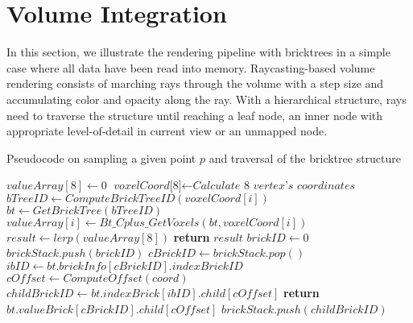 \section{Volume Integration}
In this section, we illustrate the rendering pipeline with bricktrees in a
simple case where all data have been read into memory.  
Raycasting-based volume rendering consists of marching rays through the volume with
a step size and accumulating color and opacity along the ray. With a hierarchical
structure, rays need to traverse the structure until reaching a leaf node, an inner
node with appropriate level-of-detail in current view or an unmapped node. 


\begin{algorithm}
	\caption{Pseudocode on sampling a given point $p$ and traversal of the bricktree structure }\label{alg:sample}
	\begin{algorithmic}[1]
        	\State $valueArray[8]\gets \textit{0}$
            \State $\textit{voxelCoord[8]} \gets \textit{Calculate 8 vertex's coordinates}$
            	\State $bTreeID \gets ComputeBrickTreeID(voxelCoord[i])$
                \State $bt \gets GetBrickTree(bTreeID)$
            	\State $valueArray[i] \gets Bt\_Cplus\_GetVoxels(bt,voxelCoord[i])$
            \EndWhile
            \State $result \gets lerp(valueArray[8])$
            \State \textbf{return} $result$
    	\EndProcedure
        	\State $brickID\gets \textit{0}$
            \State $brickStack.push(brickID)$
            	\State $cBrickID \gets brickStack.pop()$
                \State $ibID \gets bt.brickInfo[cBrickID].indexBrickID$
            	\State $cOffset \gets ComputeOffset(coord)$
                \State $childBrickID \gets bt.indexBrick[ibID].child[cOffset]$
                	\State \textbf{return} $bt.valueBrick[cBrickID].child[cOffset]$
                \Else
                	\State $brickStack.push(childBrickID)$
                \EndIf
            \EndWhile
    	\EndProcedure
	\end{algorithmic}
\end{algorithm}


